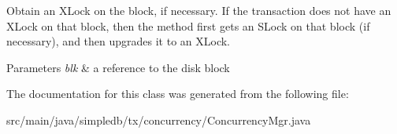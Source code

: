 Obtain an X\+Lock on the block, if necessary. If the transaction does not have an X\+Lock on that block, then the method first gets an S\+Lock on that block (if necessary), and then upgrades it to an X\+Lock. 
\begin{DoxyParams}{Parameters}
{\em blk} & a reference to the disk block \\
\hline
\end{DoxyParams}


The documentation for this class was generated from the following file\+:\begin{DoxyCompactItemize}
\item 
src/main/java/simpledb/tx/concurrency/Concurrency\+Mgr.\+java\end{DoxyCompactItemize}
